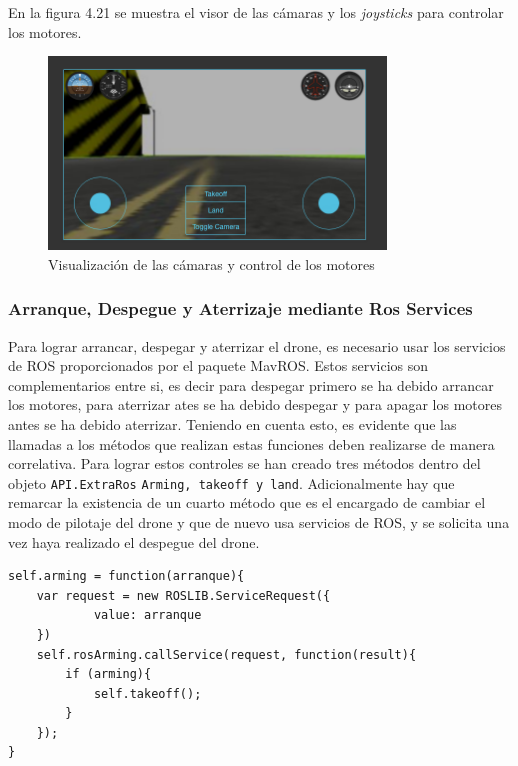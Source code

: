 En la figura 4.21 se muestra el visor de las cámaras y los \textit{joysticks} para controlar los motores.

\begin{figure}[H]
  \begin{center}
    \includegraphics[width=0.8\textwidth]{figures/camaradrone.png}
		\caption{Visualización de las cámaras y control de los motores}
		\label{fig.camaradrone}
		\end{center}
\end{figure}

\subsubsection{Arranque, Despegue y Aterrizaje mediante Ros Services}

Para lograr arrancar, despegar y aterrizar el drone, es necesario usar los servicios de ROS proporcionados por el paquete MavROS. Estos servicios son complementarios entre si, es decir para despegar primero se ha debido arrancar los motores, para aterrizar ates se ha debido despegar y para apagar los motores antes se ha debido aterrizar. Teniendo en cuenta esto, es evidente que las llamadas a los métodos que realizan estas funciones deben realizarse de manera correlativa. Para lograr estos controles se han creado tres métodos dentro del objeto \texttt{API.ExtraRos} \texttt{Arming, takeoff y land}. Adicionalmente hay que remarcar la existencia de un cuarto método que es el encargado de cambiar el modo de pilotaje del drone y que de nuevo usa servicios de ROS, y se solicita una vez haya realizado el despegue del drone.

\begin{lstlisting}[caption= Método para arrancar o apagar los motores del drone, label=cod.arming]
self.arming = function(arranque){
	var request = new ROSLIB.ServiceRequest({
			value: arranque
	})
	self.rosArming.callService(request, function(result){
		if (arming){
			self.takeoff();
		} 
	});
}
\end{lstlisting}

